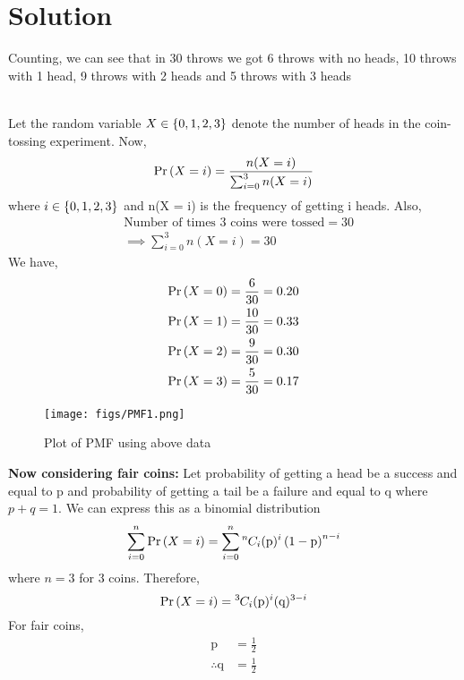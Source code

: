\documentclass[journal,12pt,twocolumn]{IEEEtran}
\begin{document}
\section{Solution}
\solution{}
Counting, we can see that in 30 throws we got 6 throws with no heads, 10 throws with 1 head, 9 throws with 2 heads and 5 throws with 3 heads
\begin{table}[ht!]
    \centering
    \label{table:table2}
    \caption{}
    \label{Table 2}	
\end{table} \\
Let the random variable $X \in \left\{0,1,2,3\right\}$ denote the number of heads in the coin-tossing experiment. Now, 
\begin{equation}
   \Pr\left(X = i\right) = \dfrac{n(X = i)}{\sum_{i=0}^{3} n(X = i) }
\end{equation}
where $i \in \left\{0,1,2,3\right\}$ and n(X = i) is the frequency of getting i heads. Also,
\begin{align}
&\text{Number of times 3 coins were tossed} = 30\\ 
&\implies  \sum_{i=0}^{3} n(X = i) = 30
\end{align}
We have,
\begin{align}
\Pr\left(X = 0\right) &= \frac{6}{30} = 0.20 \\
\Pr\left(X = 1\right) &= \frac{10}{30} = 0.33 \\
\Pr\left(X = 2\right) &= \frac{9}{30} = 0.30 \\
\Pr\left(X = 3\right) &= \frac{5}{30} = 0.17
\end{align}
\begin{figure}[ht!]
     \centering
     \texttt{[image: figs/PMF1.png]}
     \caption{Plot of PMF using above data}
     \label{fig:Figure 1}
\end{figure}
\textbf{Now considering fair coins:}
Let probability of getting a head be a success and equal to p and probability of getting a tail be a failure and equal to q where $p+q = 1$. We can express this as a binomial distribution
\begin{equation}
   \sum_{i=0}^{n} \Pr\left(X = i\right) =  \sum_{i=0}^{n} {{}^{n}\mkern-1muC_{i}}(\text{p})^i\left(1-\text{p}\right)^{n-i}
\end{equation}
where $n = 3$ for 3 coins. Therefore,
\begin{equation}
\Pr\left(X = i\right) = {{}^{3}\mkern-1muC_{i}} (\text{p})^i (\text{q})^{3-i}    
\end{equation}
For fair coins, 
\begin{align}
   \text{p} &= \frac{1}{2}\\
  \therefore  \text{q} &= \frac{1}{2}
\end{align}
\end{document}
